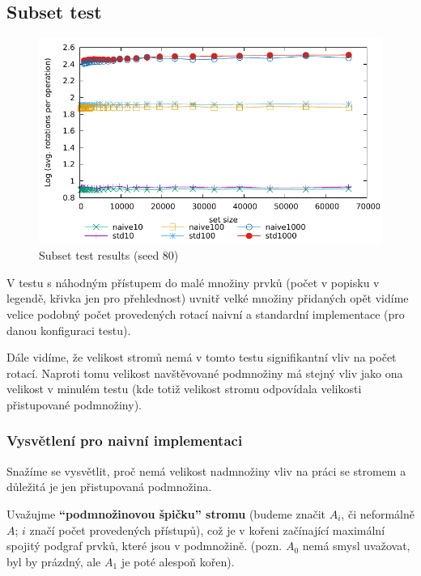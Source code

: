 \documentclass[a4paper,12pt]{article} %
\begin{document}
\pagebreak

\subsection*{Subset test}

\begin{figure}[!htb]
    \caption{Subset test results (seed 80)}
    \label{subset_results}
    \includegraphics{subset2d.pdf}    
\end{figure}

V testu s náhodným přístupem do malé množiny prvků (počet v popisku v legendě, křivka jen pro přehlednost) uvnitř velké množiny přidaných opět vidíme velice podobný počet provedených rotací naivní a standardní implementace (pro danou konfiguraci testu).

Dále vidíme, že velikost stromů nemá v tomto testu signifikantní vliv na počet rotací. Naproti tomu velikost navštěvované podmnožiny má stejný vliv jako ona velikost v minulém testu (kde totiž velikost stromu odpovídala velikosti přistupované podmnožiny).


\subsubsection*{Vysvětlení pro naivní implementaci}

Snažíme se vysvětlit, proč nemá velikost nadmnožiny vliv na práci se stromem a důležitá je jen přistupovaná podmnožina.

Uvažujme \textbf{``podmnožinovou špičku'' stromu} (budeme značit $A_i$, či neformálně $A$; $i$ značí počet provedených přístupů), což je v kořeni začínající maximální spojitý podgraf prvků, které jsou v podmnožině. (pozn. $A_0$ nemá smysl uvažovat, byl by prázdný, ale $A_1$ je poté alespoň kořen).
\end{document}
